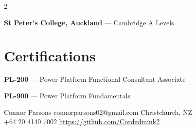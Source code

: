 \documentclass[lighthipster]{simplehipstercv}
\begin{document}
\begin{paracol}{2}
\begin{minipage}[t]{0.48\textwidth}
\textbf{St Peter's College, Auckland} --- Cambridge A Levels

\end{minipage}\hfill
\begin{minipage}[t]{0.48\textwidth}
\section*{Certifications}

\textbf{PL-200} --- Power Platform Functional Consultant Associate

\textbf{PL-900} --- Power Platform Fundamentals

\end{minipage}

\vspace{1em}

\setlength{\parindent}{0pt}
\begin{center}\fontfamily{\sfdefault}\selectfont \color{black!70}
{\footnotesize Connor Parsons  connorparsons02@gmail.com  Christchurch, NZ }\\[-0.1em]
{\footnotesize{} +64 20 4140 7002  \protect\url{https://github.com/Cordedmink2}}
\end{center}

\end{paracol}
\end{document}
